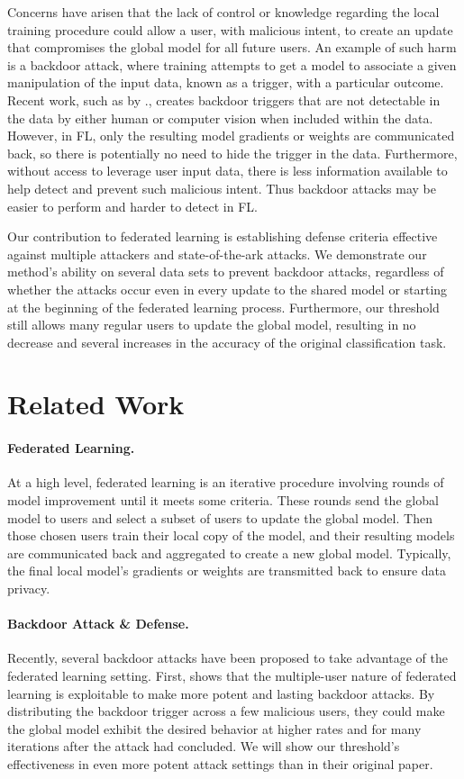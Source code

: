 \documentclass{article} %
\begin{document}
Concerns have arisen that the lack of control or knowledge regarding the local training procedure could allow a user, with malicious intent, to create an update that compromises the global model for all future users. An example of such harm is a backdoor attack, where training attempts to get a model to associate a given manipulation of the input data, known as a trigger, with a particular outcome. Recent work, such as by \cite{stamp-invisible}., creates backdoor triggers that are not detectable in the data by either human or computer vision when included within the data. However, in FL, only the resulting model gradients or weights are communicated back, so there is potentially no need to hide the trigger in the data. Furthermore, without access to leverage user input data, there is less information available to help detect and prevent such malicious intent. Thus backdoor attacks may be easier to perform and harder to detect in FL.

Our contribution to federated learning is establishing defense criteria effective against multiple attackers and state-of-the-ark attacks. We demonstrate our method's ability on several data sets to prevent backdoor attacks, regardless of whether the attacks occur even in every update to the shared model or starting at the beginning of the federated learning process. Furthermore, our threshold still allows many regular users to update the global model, resulting in no decrease and several increases in the accuracy of the original classification task.

%
\section{Related Work}

\paragraph{Federated Learning.} At a high level, federated learning is an iterative procedure involving rounds of model improvement until it meets some criteria. These rounds send the global model to users and select a subset of users to update the global model. Then those chosen users train their local copy of the model, and their resulting models are communicated back and aggregated to create a new global model. Typically, the final local model's gradients or weights are transmitted back to ensure data privacy.

\paragraph{Backdoor Attack \& Defense.} Recently, several backdoor attacks have been proposed to take advantage of the federated learning setting. First, \cite{dba} shows that the multiple-user nature of federated learning is exploitable to make more potent and lasting backdoor attacks. By distributing the backdoor trigger across a few malicious users, they could make the global model exhibit the desired behavior at higher rates and for many iterations after the attack had concluded. We will show our threshold's effectiveness in even more potent attack settings than in their original paper. 
\end{document}
